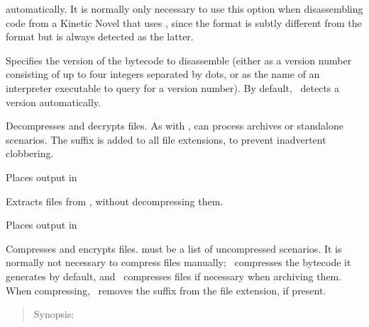 \begin{nicelist}
\begin{extraopts}
      automatically.  It is normally only necessary to use this option when
      disassembling code from a Kinetic Novel that uses ,
      since the  format is subtly different from the 
      format but is always detected as the latter.
    \item[\clbarg{f}{target-version}{VER}]
      Specifies the version of the bytecode to disassemble (either as a version
      number consisting of up to four integers separated by dots, or as the name
      of an interpreter executable to query for a version number).  By default,
      \disassembler\ detects a version automatically.
    \end{extraopts}
  \end{nicelist}

  \begin{nicelist}
  \item[\clboth{x}{extract}]
    Decompresses and decrypts files.  As with ,  can process
    archives or standalone scenarios.  The suffix  is added
    to all file extensions, to prevent inadvertent clobbering.
    \begin{extraopts}
    \item[\clbarg{o}{outdir}{DIR}]
      Places output in 
    \end{extraopts}
  \item[\clboth{b}{break}]
    Extracts files from , without decompressing them.
    \begin{extraopts}
    \item[\clbarg{o}{outdir}{DIR}]
      Places output in 
    \end{extraopts}
  \item[\clboth{c}{compress}]
    Compresses and encrypts files.   must be a list of
    uncompressed scenarios.  It is normally not necessary to compress files
    manually; \compiler\ compresses the bytecode it generates by default, and
    \archiver\ compresses files if necessary when archiving them.  When
    compressing, \archiver\ removes the suffix  from the file
    extension, if present.
  \end{nicelist}

\clearpage
{}

  \begin{quote}
    Synopsis:   
  \end{quote}

